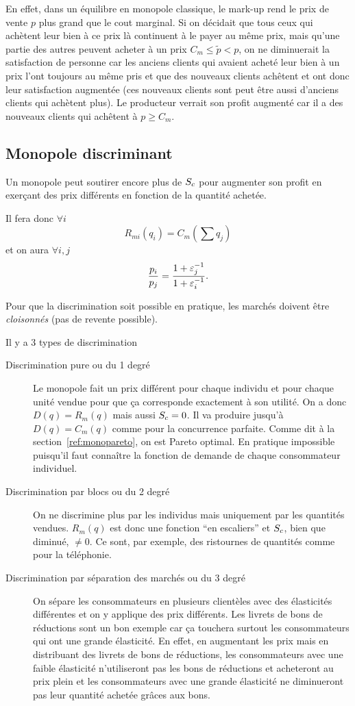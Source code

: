 En effet,
dans un équilibre en monopole classique,
le mark-up rend le prix de vente $p$ plus grand que le cout marginal.
Si on décidait que tous ceux qui achètent leur bien à ce prix
là continuent à le payer au même prix,
mais qu'une partie des autres peuvent acheter à un prix
$C_m \leq \tilde{p} < p$,
on ne diminuerait la satisfaction de personne car
les anciens clients qui avaient acheté leur bien à un prix l'ont toujours
au même pris et que des nouveaux clients achêtent et ont donc
leur satisfaction augmentée
(ces nouveaux clients sont peut être aussi
d'anciens clients qui achètent plus).
Le producteur verrait son profit augmenté car il a des nouveaux clients
qui achêtent à $p \geq C_m$.

\subsection{Monopole discriminant}
Un monopole peut soutirer encore plus de ${S_c}$ pour augmenter
son profit en exerçant des prix différents en fonction de la quantité
achetée.

Il fera donc $\forall i$
\[ R_{mi}(q_i) = C_m(\sum q_j) \]
et on aura $\forall i,j$
\[ \frac{p_i}{p_j} = \frac{1+\varepsilon_j^{-1}}{1+\varepsilon_i^{-1}}. \]

Pour que la discrimination soit possible en pratique, les marchés
doivent être \emph{cloisonnés} (pas de revente possible).

Il y a 3 types de discrimination
\begin{description}
  \item[Discrimination pure ou du 1\ier{} degré]
    Le monopole fait un prix différent pour chaque individu et pour chaque
    unité vendue pour que ça corresponde exactement à son utilité.
    On a donc $D(q) = R_m(q)$ mais aussi ${S_c} = 0$.
    Il va produire jusqu'à $D(q) = C_m(q)$ comme pour la concurrence
    parfaite.
    Comme dit à la section~\ref{ref:monopareto},
    on est Pareto optimal.
		En pratique impossible puisqu'il faut connaître
		la fonction de demande de chaque consommateur
		individuel.
  \item[Discrimination par blocs ou du 2\ieme{} degré]
    On ne discrimine plus par les individus mais uniquement par les quantités
    vendues. $R_m(q)$ est donc une fonction ``en escaliers''
		et ${S_c}$, bien que diminué, $\neq 0$.
    Ce sont, par exemple, des ristournes de quantités comme pour la téléphonie.
  \item[Discrimination par séparation des marchés ou du 3\ieme{} degré]
    On sépare les consommateurs en plusieurs clientèles avec des élasticités
    différentes et on y applique des prix différents.
    Les livrets de bons de réductions sont un bon exemple car
    ça touchera surtout les consommateurs qui ont une grande élasticité.
    En effet, en augmentant les prix mais en distribuant des livrets
    de bons de réductions, les consommateurs avec une faible élasticité
    n'utiliseront pas les bons de réductions et acheteront au prix plein
    et les consommateurs avec une grande élasticité ne diminueront pas
    leur quantité achetée grâces aux bons.
\end{description}

